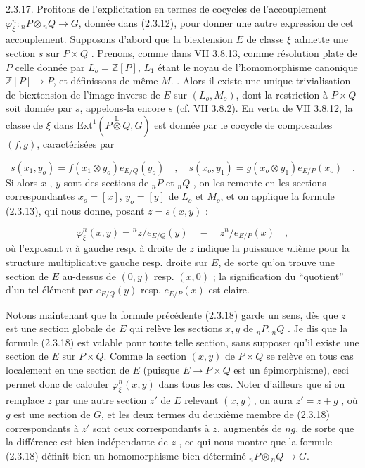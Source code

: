 2.3.17. \quad Profitons de l'explicitation en termes de cocycles de l'accouplement $\varphi_\xi^n : {}_nP \otimes {}_nQ \longrightarrow G$, donnée dans (2.3.12), pour donner une autre expression de cet accouplement. Supposons d'abord que la biextension $E$ de classe $\xi$ admette une section $s$ sur $P \times Q$ . Prenons, comme
dans VII 3.8.13, comme résolution plate de $P$ celle donnée par $L_o = \mathbb{Z}[P]$, $L_1$ étant le noyau de l'homomorphisme canonique $\mathbb{Z}[P] \longrightarrow P$, et définissons de même $M.$ . Alors il existe une unique trivialisation de biextension de l'image inverse de $E$ sur $(L_o,M_o)$, dont la restriction à $P \times Q$ soit donnée par $s$, appelons-la encore $s$ (cf. VII 3.8.2). En vertu de VII 3.8.12, la classe de $\xi$ dans $\mathrm{Ext}^1(P \stackrel{\mathbb{L}}{\otimes} Q, G)$ est donnée par le cocycle de composantes $(f,g)$, caractérisées par

\begin{equation*}
s(x_1,y_o) = f(x_1 \otimes y_o) e_{E/Q}(y_o) \quad , \quad s(x_o,y_1) = g(x_o \otimes y_1) e_{E/P}(x_o) \quad .
\end{equation*}
Si alors $x$ , $y$ sont des sections de ${}_nP$ et ${}_nQ$ , on les remonte en les sections correspondantes $x_o = [x]$, $y_o = [y]$ de $L_o$ et $M_o$, et on applique la formule (2.3.13), qui nous donne, posant $z = s(x,y)$ :

\begin{equation}\tag{2.3.18}
\varphi_{\xi}^{n}(x,y) = {}^{n}z/e_{E/Q}(y) \quad - \quad z^{n}/e_{E/P}(x) \quad ,
\end{equation}
où l'exposant $n$ à gauche resp. à droite de $z$ indique la puissance $n$.ième pour la structure multiplicative gauche resp. droite sur $E$, de sorte qu'on trouve une section de $E$ au-dessus de $(0,y)$ resp. $(x,0)$ ; la signification du ``quotient'' d'un tel élément par $e_{E/Q}(y)$ resp. $e_{E/P}(x)$ est claire.

Notons maintenant que la formule précédente (2.3.18) garde un sens, dès que $z$ est une section globale de $E$ qui relève les sections $x,y$ de ${}_nP, {}_nQ$ . Je dis que la formule (2.3.18) est valable pour toute telle section, sans supposer qu'il existe une section de $E$ sur $P \times Q$. Comme la section $(x,y)$ de $P \times Q$ se relève en tous cas localement en une section de $E$ (puisque $E \longrightarrow P \times Q$ est un épimorphisme), ceci permet donc de calculer $\varphi_{\xi}^{n}(x,y)$ dans tous les cas. Noter d'ailleurs que si on
remplace $z$ par une autre section $z'$ de $E$ relevant $(x,y)$, on aura $z' = z + g$ , où $g$ est une section de $G$, et les deux termes du deuxième membre de (2.3.18) correspondants à $z'$ sont ceux correspondants à $z$, augmentés de $ng$, de sorte que la différence est bien indépendante de $z$ , ce qui nous montre que la formule (2.3.18) définit bien un homomorphisme bien déterminé ${}_nP \otimes {}_nQ \longrightarrow G$.

